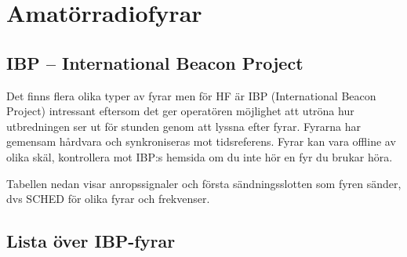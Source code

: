 \section{Amatörradiofyrar}

\subsection{IBP -- International Beacon Project}

Det finns flera olika typer av fyrar men för HF är IBP (International
Beacon Project) intressant eftersom det ger operatören möjlighet att
utröna hur utbredningen ser ut för stunden genom att lyssna efter
fyrar. Fyrarna har gemensam hårdvara och synkroniseras mot
tidsreferens. Fyrar kan vara offline av olika skäl, kontrollera mot
IBP:s hemsida om du inte hör en fyr du brukar höra.

Tabellen nedan visar anropssignaler och första sändningsslotten som
fyren sänder, dvs SCHED för olika fyrar och frekvenser.

\subsection{Lista över IBP-fyrar}

